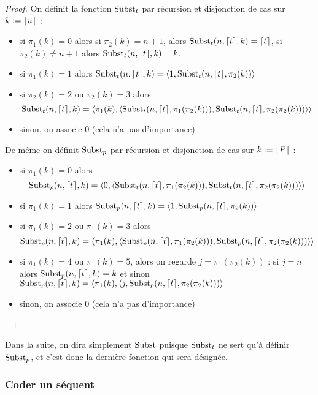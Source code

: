 \begin{proof}
    On définit la fonction $\mathrm{Subst}_t$ par récursion et disjonction de cas sur $k := \lceil u \rceil$ :
    \begin{itemize}[label=$\bullet$]
        \item si $\pi_1(k) = 0$ alors si $\pi_2(k) = n+1$, alors $\mathrm{Subst}_t(n,\lceil t \rceil,k) = \lceil t \rceil$, si $\pi_2(k)\neq n+1$ alors $\mathrm{Subst}_t(n,\lceil t \rceil,k) = k$.
        \item si $\pi_1(k) = 1$ alors $\mathrm{Subst}_t(n,\lceil t \rceil,k) = \langle 1,\mathrm{Subst}_t(n,\lceil t \rceil,\pi_2(k))\rangle$
        \item si $\pi_2(k) = 2$ ou $\pi_2(k) = 3$ alors $$\mathrm{Subst}_t(n,\lceil t \rceil,k) = \langle \pi_1(k),\langle \mathrm{Subst}_t(n,\lceil t \rceil,\pi_1(\pi_2(k))),\mathrm{Subst}_t(n,\lceil t \rceil,\pi_2(\pi_2(k)))\rangle\rangle$$
        \item sinon, on associe $0$ (cela n'a pas d'importance)
    \end{itemize}

    De même on définit $\mathrm{Subst}_p$ par récursion et disjonction de cas sur $k := \lceil P \rceil$ :
    \begin{itemize}[label=$\bullet$]
        \item si $\pi_1(k) = 0$ alors $$\mathrm{Subst}_p(n,\lceil t \rceil,k) = \langle 0,\langle\mathrm{Subst}_t(n,\lceil t \rceil,\pi_1(\pi_2(k))),\mathrm{Subst}_t(n,\lceil t \rceil,\pi_2(\pi_2(k)))\rangle\rangle$$
        \item si $\pi_1(k) = 1$ alors $\mathrm{Subst}_p(n,\lceil t \rceil,k) = \langle 1,\mathrm{Subst}_p(n,\lceil t \rceil,\pi_2(k))\rangle$
        \item si $\pi_1(k) = 2$ ou $\pi_1(k) = 3$ alors $$\mathrm{Subst}_p(n,\lceil t \rceil,k) = \langle\pi_1(k),\langle \mathrm{Subst}_p(n,\lceil t \rceil,\pi_1(\pi_2(k))),\mathrm{Subst}_p(n,\lceil t \rceil,\pi_2(\pi_2(k))) \rangle\rangle$$
        \item si $\pi_1(k) = 4$ ou $\pi_1(k) = 5$, alors on regarde $j = \pi_1(\pi_2(k))$ : si $j = n$ alors $\mathrm{Subst}_p(n,\lceil t \rceil,k) = k$ et sinon $\mathrm{Subst}_p(n,\lceil t \rceil,k) = \langle \pi_1(k),\langle j,\mathrm{Subst}_p(n,\lceil t \rceil,\pi_2(\pi_2(k)))\rangle$
        \item sinon, on associe $0$ (cela n'a pas d'importance)
    \end{itemize}
\end{proof}

Dans la suite, on dira simplement $\mathrm{Subst}$ puisque $\mathrm{Subst}_t$ ne sert qu'à définir $\mathrm{Subst}_p$, et c'est donc la dernière fonction qui sera désignée.

\subsubsection{Coder un séquent}

